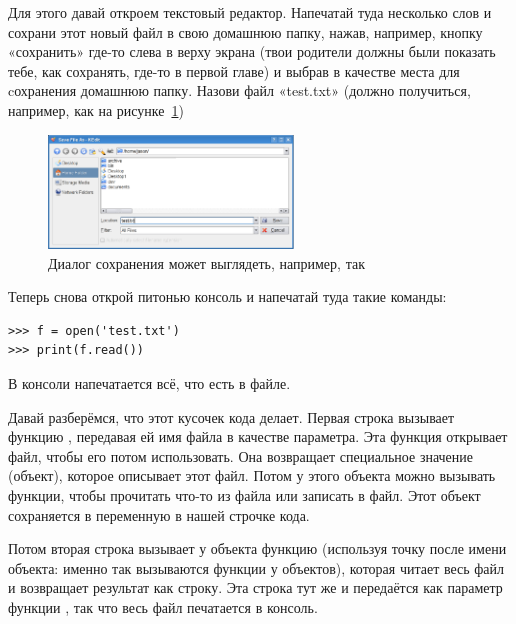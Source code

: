 \begin{LINUX}
Для этого давай откроем текстовый редактор. Напечатай туда несколько слов и сохрани этот новый файл в свою домашнюю папку, нажав, например, кнопку «сохранить» где-то слева в верху экрана (твои родители должны были показать тебе, как сохранять, где-то в первой главе) и выбрав в качестве места для cохранения домашнюю папку. Назови файл «test.txt» (должно получиться, например, как на рисунке~\ref{fig19})
	
\begin{figure}
\begin{center}
\includegraphics[width=65mm]{../en/figure19.eps}
\end{center}
\caption{Диалог сохранения может выглядеть, например, так}\label{fig19}
\end{figure}

Теперь снова открой питонью консоль и напечатай туда такие команды:

\begin{listing}
\begin{verbatim}
>>> f = open('test.txt')
>>> print(f.read())
\end{verbatim}
\end{listing}
\end{LINUX}

В консоли напечатается всё, что есть в файле.

Давай разберёмся, что этот кусочек кода делает. Первая строка вызывает функцию , передавая ей имя файла в качестве параметра. Эта функция открывает файл, чтобы его потом использовать. Она возвращает специальное значение (объект), которое описывает этот файл. Потом у этого объекта можно вызывать функции, чтобы прочитать что-то из файла или записать в файл. Этот объект сохраняется в переменную  в нашей строчке кода.

Потом вторая строка вызывает у объекта  функцию  (используя точку после имени объекта: именно так вызываются функции у объектов), которая читает весь файл и возвращает результат как строку. Эта строка тут же и передаётся как параметр функции , так что весь файл печатается в консоль.

